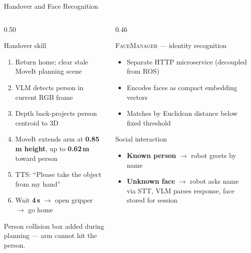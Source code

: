 \documentclass[aspectratio=169, 10pt]{beamer}
\begin{document}
\begin{frame}{Handover and Face Recognition}
  \begin{columns}[T]
    \begin{column}{0.50\textwidth}
      \begin{block}{Handover skill}
        \begin{enumerate}\small
          \item Return home; clear stale MoveIt planning scene
          \item VLM detects person in current RGB frame
          \item Depth back-projects person centroid to 3D
          \item MoveIt extends arm at \textbf{0.85\,m height},
                up to \textbf{0.62\,m} toward person
          \item TTS: ``Please take the object from my hand''
          \item Wait \textbf{4\,s} $\to$ open gripper $\to$ go home
        \end{enumerate}
      \end{block}
      \vspace{0.15em}
      {\small Person collision box added during planning ---
       arm cannot hit the person.}
    \end{column}

    \begin{column}{0.46\textwidth}
      \begin{block}{\textsc{FaceManager} --- identity recognition}
        \begin{itemize}\small
          \item Separate HTTP microservice (decoupled from ROS)
          \item Encodes faces as compact embedding vectors
          \item Matches by Euclidean distance below fixed threshold
        \end{itemize}
      \end{block}
      \vspace{0.3em}
      \begin{exampleblock}{Social interaction}
        \begin{itemize}\small
          \item \textbf{Known person} $\to$ robot greets by name
          \item \textbf{Unknown face} $\to$ robot asks name via STT,
                VLM parses response, face stored for session
        \end{itemize}
      \end{exampleblock}
    \end{column}
  \end{columns}
\end{frame}
\end{document}
